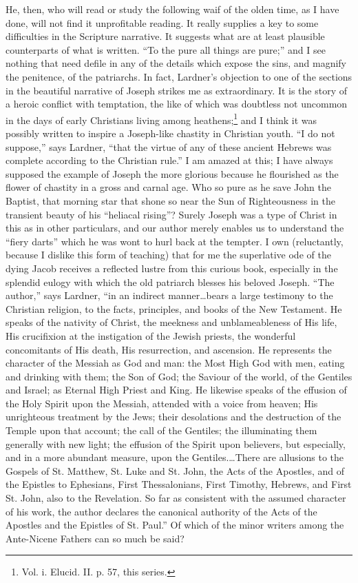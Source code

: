 He, then, who will read or study the following waif of the olden time, as I have done, will not find it unprofitable reading. It really supplies a key to some difficulties in the Scripture narrative. It suggests what are at least plausible counterparts of what is written. “To the pure all things are pure;” and I see nothing that need defile in any of the details which expose the sins, and magnify the penitence, of the patriarchs. In fact, Lardner’s objection to one of the sections in the beautiful narrative of Joseph strikes me as extraordinary. It is the story of a heroic conflict with temptation, the like of which was doubtless not uncommon in the days of early Christians living among heathens;\footnote{Vol. i. Elucid. II. p. 57, this series.} and I think it was possibly written to inspire a Joseph-like chastity in Christian youth. “I do not suppose,” says Lardner, “that the virtue of any of these ancient Hebrews was complete according to the Christian rule.” I am amazed at this; I have always supposed the example of Joseph the more glorious because he flourished as the flower of chastity in a gross and carnal age. Who so pure as he save John the Baptist, that morning star that shone so near the Sun of Righteousness in the transient beauty of his “heliacal rising”? Surely Joseph was a type of Christ in this as in other particulars, and our author merely enables us to understand the “fiery darts” which he was wont to hurl back at the tempter. I own (reluctantly, because I dislike this form of teaching) that for me the superlative ode of the dying Jacob receives a reflected lustre from this curious book, especially in the splendid eulogy with which the old patriarch blesses his beloved Joseph. “The author,” says Lardner, “in an indirect manner…bears a large testimony to the Christian religion, to the facts, principles, and books of the New Testament. He speaks of the nativity of Christ, the meekness and unblameableness of His life, His crucifixion at the instigation of the Jewish priests, the wonderful concomitants of His death, His resurrection, and ascension. He represents the character of the Messiah as God and man: the Most High God with men, eating and drinking with them; the Son of God; the Saviour of the world, of the Gentiles and Israel; as Eternal High Priest and King. He likewise speaks of the effusion of the Holy Spirit upon the Messiah, attended with a voice from heaven; His unrighteous treatment by the Jews; their desolations and the destruction of the Temple upon that account; the call of the Gentiles; the illuminating them generally with new light; the effusion of the Spirit upon believers, but especially, and in a more abundant measure, upon the Gentiles.…There are allusions to the Gospels of St. Matthew, St. Luke and St. John, the Acts of the Apostles, and of the Epistles to Ephesians, First Thessalonians, First Timothy, Hebrews, and First St. John, also to the Revelation. So far as consistent with the assumed character of his work, the author declares the canonical authority of the Acts of the Apostles and the Epistles of St. Paul.” Of which of the minor writers among the Ante-Nicene Fathers can so much be said?

